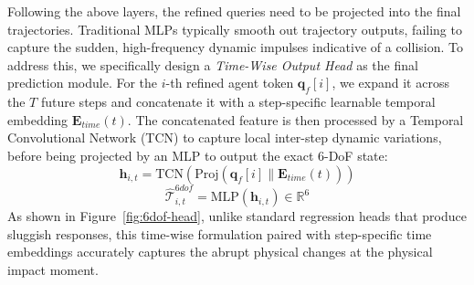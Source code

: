\documentclass[runningheads]{llncs}
\begin{document}
Following the above layers, the refined queries need to be projected into the final trajectories. Traditional MLPs typically smooth out trajectory outputs, failing to capture the sudden, high-frequency dynamic impulses indicative of a collision. To address this, we specifically design a \textit{Time-Wise Output Head} as the final prediction module. For the $i$-th refined agent token $\mathbf{q}_f[i]$, we expand it across the $T$ future steps and concatenate it with a step-specific learnable temporal embedding $\mathbf{E}_{time}(t)$. The concatenated feature is then processed by a Temporal Convolutional Network (TCN) to capture local inter-step dynamic variations, before being projected by an MLP to output the exact 6-DoF state:
\begin{equation}
    \mathbf{h}_{i,t} = \text{TCN} \left( \text{Proj}(\mathbf{q}_f[i] \parallel \mathbf{E}_{time}(t)) \right)
\end{equation}
\begin{equation}
    \hat{\mathcal{T}}_{i,t}^{6dof} = \text{MLP}(\mathbf{h}_{i,t}) \in \mathbb{R}^6
\end{equation}
As shown in Figure~\ref{fig:6dof-head}, unlike standard regression heads that produce sluggish responses, this time-wise formulation paired with step-specific time embeddings accurately captures the abrupt physical changes at the physical impact moment.


\end{document}
